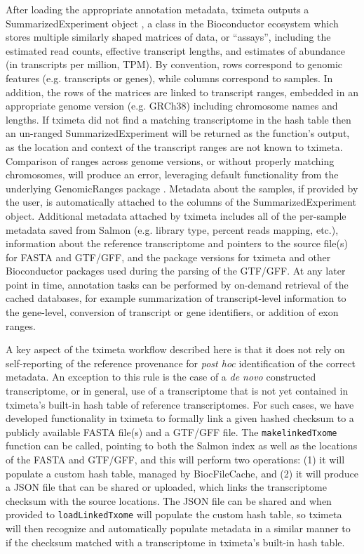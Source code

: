 \documentclass[12pt]{article} \usepackage[utf8]{inputenc}
\begin{document}
After loading the appropriate annotation metadata, tximeta outputs a
SummarizedExperiment object \citep{granges}, a class in the
Bioconductor ecosystem which stores multiple similarly shaped matrices
of data, or ``assays'', including the estimated read counts, effective
transcript lengths, and estimates of abundance (in transcripts per
million, TPM). By convention, rows correspond to genomic features
(e.g. transcripts or genes), while columns correspond to samples. In
addition, the rows of the matrices are linked to transcript ranges,
embedded in an appropriate genome version (e.g. GRCh38) including
chromosome names and lengths. If tximeta did not find a matching
transcriptome in the hash table then an un-ranged SummarizedExperiment
will be returned as the function's output, as the location and context
of the transcript ranges are not known to tximeta. Comparison of
ranges across genome versions, or without properly matching
chromosomes, will produce an error, leveraging default functionality
from the underlying GenomicRanges package \citep{granges}. Metadata
about the samples, if provided by the user, is automatically attached
to the columns of the SummarizedExperiment object. Additional metadata
attached by tximeta includes all of the per-sample metadata saved from
Salmon (e.g. library type, percent reads mapping, etc.), information
about the reference transcriptome and pointers to the source file(s)
for FASTA and GTF/GFF, and the package versions for tximeta and other
Bioconductor packages used during the parsing of the GTF/GFF. At any
later point in time, annotation tasks can be performed by on-demand
retrieval of the cached databases, for example summarization of
transcript-level information to the gene-level, conversion of
transcript or gene identifiers, or addition of exon ranges.

A key aspect of the tximeta workflow described here is that it does
not rely on self-reporting of the reference provenance for
\textit{post hoc} identification of the correct metadata. An exception
to this rule is the case of a \textit{de novo} constructed
transcriptome, or in general, use of a transcriptome that is not yet
contained in tximeta's built-in hash table of reference
transcriptomes. For such cases, we have developed functionality in
tximeta to formally link a given hashed checksum to a publicly
available FASTA file(s) and a GTF/GFF file. The
\texttt{makelinkedTxome} function can be called, pointing to both the
Salmon index as well as the locations of the FASTA and GTF/GFF, and
this will perform two operations: (1) it will populate a custom hash
table, managed by BiocFileCache, and (2) it will produce a JSON file
that can be shared or uploaded, which links the transcriptome checksum
with the source locations. The JSON file can be shared and when
provided to \texttt{loadLinkedTxome} will populate the custom hash
table, so tximeta will then recognize and automatically populate
metadata in a similar manner to if the checksum matched with a
transcriptome in tximeta's built-in hash table.
\end{document}

